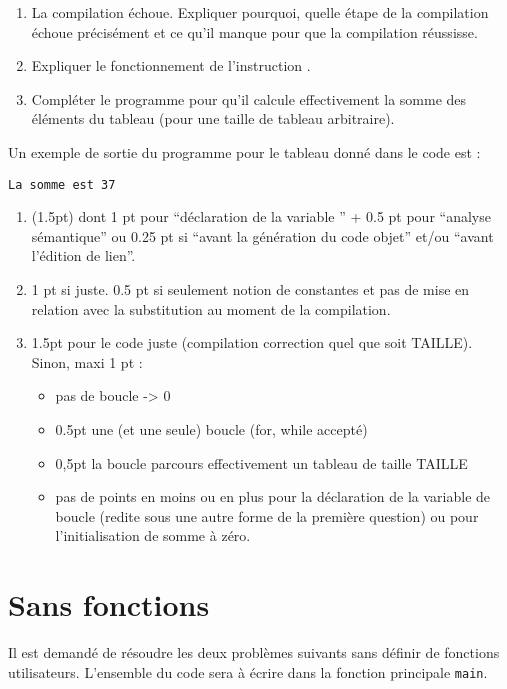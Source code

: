 \begin{enumerate}
\item La compilation échoue. Expliquer pourquoi, quelle étape de la
  compilation échoue précisément et ce qu'il manque pour que la compilation réussisse. 
\item Expliquer le fonctionnement de l'instruction .
\item Compléter le programme pour qu'il calcule effectivement la somme
  des éléments du tableau (pour une taille de tableau arbitraire).
\end{enumerate}

Un exemple de sortie du programme pour le tableau donné dans le code est :
\begin{verbatim}
La somme est 37
\end{verbatim}

\begin{correction}
\begin{enumerate}
\item (1.5pt) dont 1 pt pour ``déclaration de la variable '' + 0.5 pt pour ``analyse
  sémantique'' ou 0.25 pt si ``avant la génération du code objet'' et/ou
  ``avant l'édition de lien''.
\item 1 pt si juste. 0.5 pt si seulement notion de constantes et pas de mise en
  relation avec la substitution au moment de la compilation.
\item 1.5pt pour le code juste (compilation correction quel que soit
  TAILLE). Sinon, maxi 1 pt :
  \begin{itemize}
  \item pas de boucle -> 0
  \item 0.5pt une (et une seule) boucle (for, while accepté)
  \item 0,5pt la boucle parcours effectivement un tableau de taille TAILLE
  \item pas de points en moins ou en plus pour la déclaration de la
    variable de boucle (redite sous une autre forme de la première
    question) ou pour l'initialisation de somme à zéro.
  \end{itemize}
\end{enumerate}
\end{correction}

\section{Sans fonctions}

Il est demandé de résoudre les deux problèmes suivants sans définir de
fonctions utilisateurs.  L'ensemble du code sera à écrire dans la
fonction principale \verb|main|.

